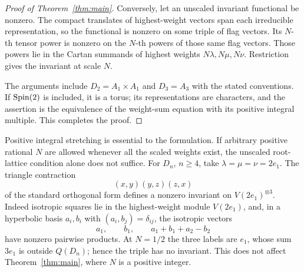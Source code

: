 \begin{proof}[Proof of Theorem~\ref{thm:main}]
Conversely, let an unscaled invariant functional be nonzero.
The compact translates of highest-weight vectors span each
irreducible representation, so the functional is nonzero on some
triple of flag vectors.  Its \(N\)-th tensor power is nonzero on the
\(N\)-th powers of those same flag vectors.  Those powers lie in the
Cartan summands of highest weights \(N\lambda,N\mu,N\nu\).
Restriction gives the invariant at scale \(N\).

The arguments include \(D_2=A_1\times A_1\) and \(D_3=A_3\) with
the stated conventions.  If \(\operatorname{Spin}(2)\) is included, it is a torus;
its representations are characters, and the assertion is the
equivalence of the weight-sum equation with its positive integral
multiple.  This completes the proof.
\end{proof}

\begin{remark}\label{tail:fractional}
Positive integral stretching is essential to the formulation.
If arbitrary positive rational \(N\) are allowed whenever all the
scaled weights exist, the unscaled root-lattice condition alone does
not suffice.  For \(D_n\), \(n\ge4\), take
\(\lambda=\mu=\nu=2e_1\).
The triangle contraction
\[
 (x,y)(y,z)(z,x)
\]
of the standard orthogonal form defines a nonzero invariant on
\(V(2e_1)^{\otimes3}\).
Indeed isotropic squares lie in the highest-weight module
\(V(2e_1)\), and, in a hyperbolic basis \(a_i,b_i\) with
\((a_i,b_j)=\delta_{ij}\), the isotropic vectors
\[
 a_1,\qquad b_1,\qquad a_1+b_1+a_2-b_2
\]
have nonzero pairwise products.  At \(N=1/2\) the three labels are
\(e_1\), whose sum \(3e_1\) is outside \(Q(D_n)\); hence the triple
has no invariant.  This does not affect
Theorem~\ref{thm:main}, where \(N\) is a positive integer.
\end{remark}
